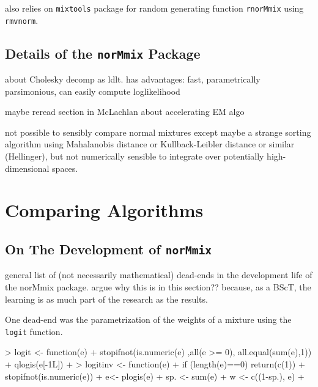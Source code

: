 also relies on {\tt mixtools} package for random generating function 
{\tt rnorMmix} using {\tt rmvnorm}.

\section{Details of the {\tt norMmix} Package}

about Cholesky decomp as ldlt. has advantages: fast, parametrically 
parsimonious, can easily compute loglikelihood


maybe reread section in McLachlan about accelerating EM algo

not possible to sensibly compare normal mixtures except maybe a strange sorting 
algorithm using Mahalanobis distance or Kullback-Leibler distance or similar
(Hellinger), but not numerically sensible to integrate over potentially 
high-dimensional spaces.





\chapter{Comparing Algorithms}

\section{On The Development of {\tt norMmix}}

general list of (not necessarily mathematical) dead-ends in the development 
life of the norMmix package.
argue why this is in this section?? because, as a BScT, the learning is as much
part of the research as the results.


One dead-end was the parametrization of the weights of a mixture using the 
{\tt logit} function.

\begin{Schunk}
\begin{Sinput}
> logit <- function(e) {
+     stopifnot(is.numeric(e) ,all(e >= 0), all.equal(sum(e),1))
+     qlogis(e[-1L])
+ }
> logitinv <- function(e) {
+     if (length(e)==0) {return(c(1))}
+     stopifnot(is.numeric(e))
+     e<- plogis(e)
+     sp. <- sum(e)
+     w <- c((1-sp.), e)
+ }
\end{Sinput}
\end{Schunk}

